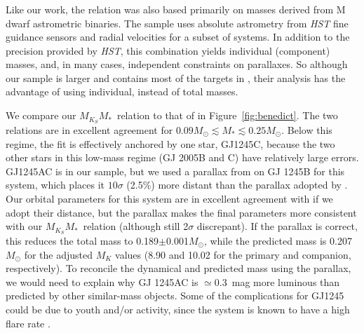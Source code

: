 \documentclass[twocolumn]{aastex62}
\newcommand{\mmk}{$M_{K_S}$\textendash$M_*$}
\begin{document}
\subsubsection{\citet{Benedict2016}}
Like our work, the \citet{Benedict2016} relation was also based primarily on masses derived from M dwarf astrometric binaries. The \citet{Benedict2016} sample uses absolute astrometry from {\it HST} fine guidance sensors and radial velocities for a subset of systems. In addition to the precision provided by {\it HST}, this combination yields individual (component) masses, and, in many cases, independent constraints on parallaxes. So although our sample is larger and contains most of the targets in \citet{Benedict2016}, their analysis has the advantage of using individual, instead of total masses.

We compare our \mmk\ relation to that of \citet{Benedict2016} in Figure~\ref{fig:benedict}. The two relations are in excellent agreement for $0.09M_\odot\lesssim M_* \lesssim 0.25M_\odot$. Below this regime, the \citet{Benedict2016} fit is effectively anchored by one star, GJ1245C, because the two other stars in this low-mass regime (GJ 2005B and C) have relatively large errors. GJ1245AC is in our sample, but we used a parallax from \citet{GaiaDr2} on GJ 1245B for this system, which places it $10\sigma$ (2.5\%) more distant than the parallax adopted by \citet{Benedict2016}. Our orbital parameters for this system are in excellent agreement with \citet{Benedict2016} if we adopt their distance, but the \citet{GaiaDr2} parallax makes the final parameters more consistent with our \mmk\ relation (although still 2$\sigma$ discrepant). If the \citet{Benedict2016} parallax is correct, this reduces the total mass to 0.189$\pm$0.001$M_\odot$, while the predicted mass is 0.207$M_\odot$ for the adjusted $M_K$ values (8.90 and 10.02 for the primary and companion, respectively). To reconcile the dynamical and predicted mass using the \citet{Benedict2016} parallax, we would need to explain why GJ 1245AC is $\simeq$0.3~mag more luminous than predicted by other similar-mass objects. Some of the complications for GJ1245 could be due to youth and/or activity, since the system is known to have a high flare rate \citep{Laurie2015}. 
\end{document}
